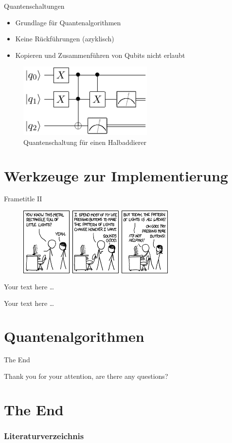 \documentclass[compress,aspectratio=1610]{beamer}
\begin{document}
\begin{frame}{Quantenschaltungen}
  \begin{itemize}
  \item Grundlage f\"ur Quantenalgorithmen
  \item Keine R\"uckf\"uhrungen (azyklisch)
  \item Kopieren und Zusammenf\"uhren von Qubits nicht erlaubt
  \end{itemize}
  \begin{figure}[h]
    \centering
    \includegraphics[width=0.6\textwidth]{figures/half-adder.pdf}
    \caption{Quantenschaltung f\"ur einen Halbaddierer}
  \end{figure}
\end{frame}

\section{Werkzeuge zur Implementierung}
\begin{frame}{Frametitle II}
  \begin{figure}[!h]
    \centering
    \includegraphics[width=0.7\textwidth]{figures/computer_problems.png}
  \end{figure}
\end{frame}
\begin{frame}
   Your text here \dots
\end{frame}
\begin{frame}
  Your text here \dots
\end{frame}

\section{Quantenalgorithmen}
\begin{frame}{The End}
  \begin{center}
    Thank you for your attention, are there any questions?
  \end{center}
\end{frame}

\section*{The End}
\begin{frame}[allowframebreaks]
  \frametitle{Literaturverzeichnis}
  
  
\end{frame}
\end{document}
